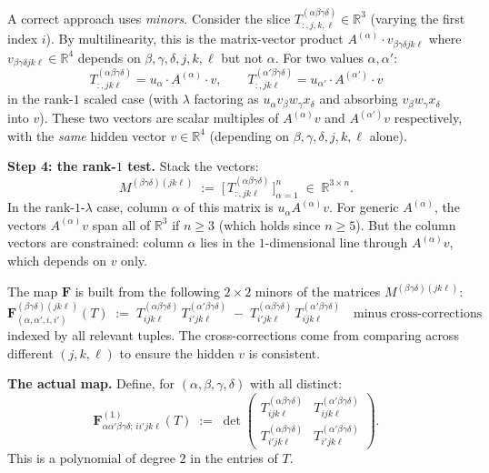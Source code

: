 \medskip
A correct approach uses \emph{minors}.  Consider the slice $T^{(\alpha\beta\gamma\delta)}_{:,j,k,\ell}\in\mathbb R^3$ (varying the first index $i$).  By multilinearity, this is the matrix-vector product $A^{(\alpha)}\cdot v_{\beta\gamma\delta jk\ell}$ where $v_{\beta\gamma\delta jk\ell}\in\mathbb R^4$ depends on $\beta,\gamma,\delta,j,k,\ell$ but not $\alpha$.  For two values $\alpha,\alpha'$:
\[
T^{(\alpha\beta\gamma\delta)}_{:,jk\ell} = u_\alpha\cdot A^{(\alpha)}\cdot v,\qquad T^{(\alpha'\beta\gamma\delta)}_{:,jk\ell}=u_{\alpha'}\cdot A^{(\alpha')}\cdot v
\]
in the rank-$1$ scaled case (with $\lambda$ factoring as $u_\alpha v_\beta w_\gamma x_\delta$ and absorbing $v_\beta w_\gamma x_\delta$ into $v$).  These two vectors are scalar multiples of $A^{(\alpha)}v$ and $A^{(\alpha')}v$ respectively, with the \emph{same} hidden vector $v\in\mathbb R^4$ (depending on $\beta,\gamma,\delta,j,k,\ell$ alone).

\medskip
\noindent\textbf{Step 4: the rank-$1$ test.}  Stack the vectors:
\[
M^{(\beta\gamma\delta)(jk\ell)} \;:=\;\bigl[\,T^{(\alpha\beta\gamma\delta)}_{:,jk\ell}\,\bigr]_{\alpha=1}^n\;\in\;\mathbb R^{3\times n}.
\]
In the rank-$1$-$\lambda$ case, column $\alpha$ of this matrix is $u_\alpha A^{(\alpha)}v$.  For generic $A^{(\alpha)}$, the vectors $A^{(\alpha)}v$ span all of $\mathbb R^3$ if $n\geq 3$ (which holds since $n\geq 5$).  But the column vectors are constrained: column $\alpha$ lies in the $1$-dimensional line through $A^{(\alpha)}v$, which depends on $v$ only.

\medskip
The map $\mathbf F$ is built from the following $2\times 2$ minors of the matrices $M^{(\beta\gamma\delta)(jk\ell)}$:
\[
\mathbf F_{(\alpha,\alpha',i,i')}^{(\beta\gamma\delta)(jk\ell)}(T) \;:=\; T^{(\alpha\beta\gamma\delta)}_{ijk\ell}\,T^{(\alpha'\beta\gamma\delta)}_{i'jk\ell}\;-\;T^{(\alpha\beta\gamma\delta)}_{i'jk\ell}\,T^{(\alpha'\beta\gamma\delta)}_{ijk\ell}\quad\text{minus}\;\text{cross-corrections}
\]
indexed by all relevant tuples.  The cross-corrections come from comparing across different $(j,k,\ell)$ to ensure the hidden $v$ is consistent.

\medskip
\textbf{The actual map.}  Define, for $(\alpha,\beta,\gamma,\delta)$ with all distinct:
\[
\mathbf F^{(1)}_{\alpha\alpha'\beta\gamma\delta;\,ii'jk\ell}(T) \;:=\;
\det\begin{pmatrix} T^{(\alpha\beta\gamma\delta)}_{ijk\ell} & T^{(\alpha'\beta\gamma\delta)}_{ijk\ell} \\ T^{(\alpha\beta\gamma\delta)}_{i'jk\ell} & T^{(\alpha'\beta\gamma\delta)}_{i'jk\ell} \end{pmatrix}.
\]
This is a polynomial of degree $2$ in the entries of $T$.

